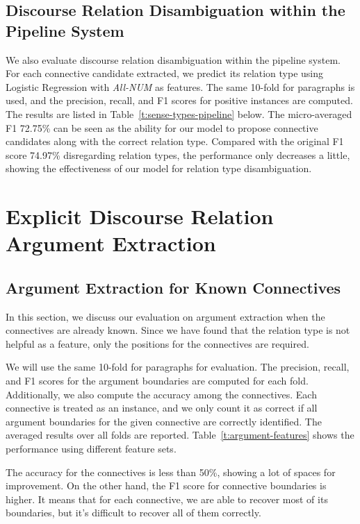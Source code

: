 

\subsection{Discourse Relation Disambiguation within the Pipeline System}

We also evaluate discourse relation disambiguation within the pipeline system.
For each connective candidate extracted, we predict its relation type using
Logistic Regression with \textit{All-NUM} as features.
The same 10-fold for paragraphs is used, and the precision, recall, and F1 scores
for positive instances are computed. The results are listed in
Table~\ref{t:sense-types-pipeline} below. The micro-averaged F1 72.75\% can be seen
as the ability for our model to propose connective candidates along with the correct
relation type. Compared with the original F1 score 74.97\% disregarding relation types,
the performance only decreases a little, showing the effectiveness of our
model for relation type disambiguation.



\section{Explicit Discourse Relation Argument Extraction}

\subsection{Argument Extraction for Known Connectives}

In this section, we discuss our evaluation on argument extraction when the
connectives are already known. Since we have found that the relation type
is not helpful as a feature, only the positions for the connectives are required.

We will use the same 10-fold for paragraphs for evaluation.
The precision, recall, and F1 scores for the argument boundaries are
computed for each fold. Additionally, we also compute the accuracy among the 
connectives. Each connective is treated as an instance, and we only count it
as correct if all argument boundaries for the given connective are correctly identified.
The averaged results over all folds are reported. Table~\ref{t:argument-features} shows
the performance using different feature sets.

The accuracy for the connectives is less than 50\%, showing a lot of spaces for
improvement. On the other hand, the F1 score for connective boundaries is higher.
It means that for each connective, we are able to recover most of its
boundaries, but it's difficult to recover all of them correctly.

